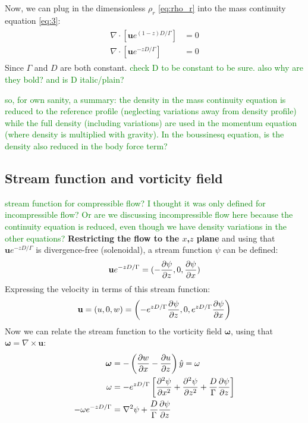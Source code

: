 \documentclass[document.tex]{subfiles}
\begin{document}
Now, we can plug in the dimensionless $\rho_r$ \eqref{eq:rho_r} into the mass continuity equation \eqref{eq:3}: 
\begin{align}
    \begin{split}
        \nabla \cdot [\mathbf{u} e^{(1-z)D/\Gamma}] &= 0 \\
        \nabla \cdot [\mathbf{u} e^{-zD/\Gamma}] &= 0 
    \end{split}
\end{align}
Since $\Gamma$ and $D$ are both constant. \textcolor{green}{check D to be constant to be sure. also why are they bold? and is D italic/plain?}

\textcolor{green}{so, for own sanity, a summary: the density in the mass continuity equation is reduced to the reference profile (neglecting variations away from density profile) while the full
density (including variations) are used in the momentum equation (where density is multiplied with gravity). In the boussinesq equation, is the density also reduced in the body force term? }

\subsection{Stream function and vorticity field}
\textcolor{green}{stream function for compressible flow? I thought it was only defined for incompressible flow? Or are we discussing 
incompressible flow here because the continuity equation is reduced, even though we have density variations in the other equations?}
\textbf{Restricting the flow to the $x$,$z$ plane} and using that $\mathbf{u} e^{-zD/\Gamma}$ is divergence-free (solenoidal), a stream function $\psi$ can be defined: 
\begin{align}
    \label{eq:23}
    \mathbf{u} e^{-zD/\Gamma} = (-\pdv{\psi}{z}, 0, \pdv{\psi}{x})
\end{align}
Expressing the velocity in terms of this stream function: 
\begin{align}
    \label{eq:24}
    \mathbf{u} = (u,0,w) = \left(-e^{zD/\Gamma}\pdv{\psi}{z},0,e^{zD/\Gamma}\pdv{\psi}{x}\right)
\end{align}
Now we can relate the stream function to the vorticity field $\mathbf{\omega}$, using that $\mathbf{\omega} = \nabla \times \mathbf{u}$: 
\begin{align*}
    \bm{\omega} &= -\left(\pdv{w}{x}-\pdv{u}{z}\right)\hat{y} = \omega \\
    \omega &=-e^{zD/\Gamma}\left[\pdv[2]{\psi}{x}+\pdv[2]{\psi}{z} + \frac{D}{\Gamma}\pdv{\psi}{z}\right] \\
    -\omega e^{-zD/\Gamma}&=\nabla^2\psi +\frac{D}{\Gamma} \pdv{\psi}{z} 
\end{align*}
\end{document}

